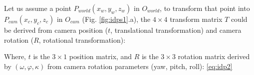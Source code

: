 Let us assume a point $P_{world} (x_w,y_w,z_w)$ in $O_{world}$, to transform that point into $P_{cam} (x_c,y_c,z_c)$ in $O_{cam}$ (Fig. \ref{fig:idps1}.a), the $4\times4$ transform matrix $T$ could be derived from camera position ($t$, translational transformation) and camera rotation ($R$, rotational transformation):



\noindent 
Where, $t$ is the $3\times1$ position matrix, and $R$ is the $3\times3$ rotation matrix derived by $(\omega, \varphi, \kappa)$ from camera rotation parameters (yaw, pitch, roll): \ref{eq:idp2}



